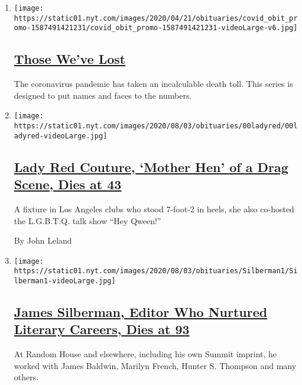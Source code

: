 \begin{enumerate}
\def\labelenumi{\arabic{enumi}.}
\item
  \texttt{[image: https://static01.nyt.com/images/2020/04/21/obituaries/covid\_obit\_promo-1587491421231/covid\_obit\_promo-1587491421231-videoLarge-v6.jpg]}

  \hypertarget{those-weve-lost}{%
  \subsection{\texorpdfstring{\href{https://www.nytimes.com/interactive/2020/obituaries/people-died-coronavirus-obituaries.html}{Those
  We've Lost}}{Those We've Lost}}\label{those-weve-lost}}

  The coronavirus pandemic has taken an incalculable death toll. This
  series is designed to put names and faces to the numbers.
\item
  \texttt{[image: https://static01.nyt.com/images/2020/08/03/obituaries/00ladyred/00ladyred-videoLarge.jpg]}

  \hypertarget{lady-red-couture-mother-hen-of-a-drag-scene-dies-at-43}{%
  \subsection{\texorpdfstring{\href{/2020/08/01/arts/lady-red-couture-dead.html}{Lady
  Red Couture, `Mother Hen' of a Drag Scene, Dies at
  43}}{Lady Red Couture, `Mother Hen' of a Drag Scene, Dies at 43}}\label{lady-red-couture-mother-hen-of-a-drag-scene-dies-at-43}}

  A fixture in Los Angeles clubs who stood 7-foot-2 in heels, she also
  co-hosted the L.G.B.T.Q. talk show ``Hey Qween!''

  By John Leland
\item
  \texttt{[image: https://static01.nyt.com/images/2020/08/03/obituaries/Silberman1/Silberman1-videoLarge.jpg]}

  \hypertarget{james-silberman-editor-who-nurtured-literary-careers-dies-at-93}{%
  \subsection{\texorpdfstring{\href{/2020/08/01/books/james-silberman-dead.html}{James
  Silberman, Editor Who Nurtured Literary Careers, Dies at
  93}}{James Silberman, Editor Who Nurtured Literary Careers, Dies at 93}}\label{james-silberman-editor-who-nurtured-literary-careers-dies-at-93}}

  At Random House and elsewhere, including his own Summit imprint, he
  worked with James Baldwin, Marilyn French, Hunter S. Thompson and many
  others.


\end{enumerate}
